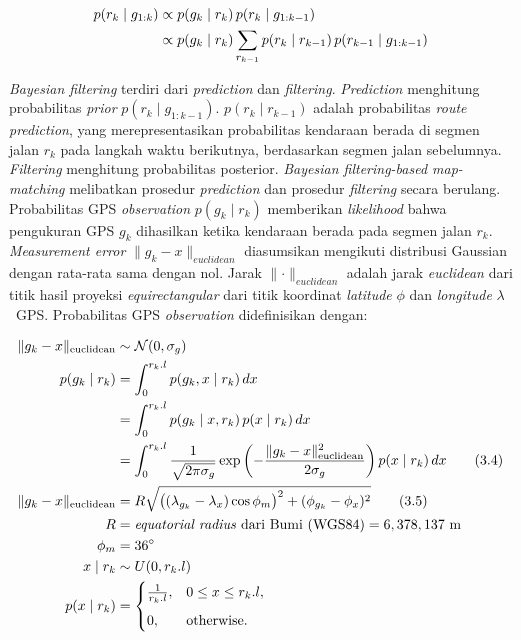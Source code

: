 \begin{align}
p(r_k \mid g_{1:k}) 
&\propto p(g_k \mid r_k)\, p(r_k \mid g_{1:k-1}) \notag\\
&\propto p(g_k \mid r_k) \sum_{r_{k-1}} p(r_k \mid r_{k-1}) \, p(r_{k-1} \mid g_{1:k-1})
\label{eq:bayesian-filtering}
\end{align}

\textit{Bayesian filtering} terdiri dari \textit{prediction} dan \textit{filtering}. \textit{Prediction} menghitung probabilitas \textit{prior} $p(r_k \mid g_{1:k-1})$. $p(r_k\mid r_{k-1})$ adalah probabilitas \textit{route prediction}, yang merepresentasikan probabilitas kendaraan berada di segmen jalan $r_k$ pada langkah waktu berikutnya, berdasarkan segmen jalan sebelumnya. \textit{Filtering} menghitung probabilitas posterior. \textit{Bayesian filtering-based map-matching} melibatkan prosedur \textit{prediction} dan prosedur \textit{filtering} secara berulang. Probabilitas GPS \textit{observation} $p(g_k \mid r_k)$ memberikan \textit{likelihood} bahwa pengukuran GPS $g_k$ dihasilkan ketika kendaraan berada pada segmen jalan $r_k$. \textit{Measurement error} $\lVert g_k-x\rVert_{euclidean}$ diasumsikan mengikuti distribusi Gaussian dengan rata-rata sama dengan nol. Jarak $\lVert \cdot \rVert_{euclidean}$ adalah jarak \textit{euclidean} dari titik hasil proyeksi \textit{equirectangular} dari titik koordinat \textit{latitude} $\phi$  dan \textit{longitude} $\lambda$ \ GPS. Probabilitas GPS \textit{observation} didefinisikan dengan:

\begin{align}
\lVert g_k - x \rVert_{\text{euclidean}} &\sim \mathcal{N}(0,\sigma_g) \notag \\
p(g_k \mid r_k) &= \int_{0}^{r_k.l} p(g_k,x \mid r_k)\, dx \notag  \\
&= \int_{0}^{r_k.l} p(g_k \mid x, r_k)\, p(x \mid r_k)\, dx \notag  \\
&= \int_{0}^{r_k.l} \frac{1}{\sqrt{2\pi\sigma_g}}
    \exp \left(-\frac{\lVert g_k - x \rVert_{\text{euclidean}}^2}{2\sigma_g} \right)
    p(x \mid r_k)\, dx \tag{3.4}\\
\lVert g_k - x \rVert_{\text{euclidean}} 
&= R\sqrt{\bigl((\lambda_{g_k}-\lambda_{x})\cos\phi_m\bigr)^2+(\phi_{g_k}-\phi_{x})^2} \tag{3.5} \\
R &= \text{\textit{equatorial radius} dari Bumi (WGS84)} = 6,378,137 \ \text{m}\notag  \\ 
\phi_m &= 36^\circ \notag \\
x\mid r_k &\sim U(0,r_k.l) \notag \\ 
p(x\mid r_k) &= 
\begin{cases}
\frac{1}{r_k.l}, & 0 \leq x \leq r_k.l,\\[6pt]
0, & \text{otherwise}.
\end{cases} 
\end{align}



